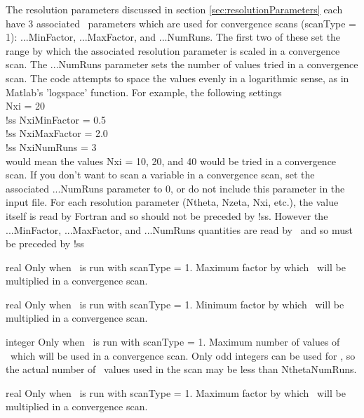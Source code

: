 The resolution parameters discussed in section \ref{sec:resolutionParameters}
each have 3 associated \sfincsScan~parameters
which are used for convergence scans ({\ttfamily scanType} = 1): {\ttfamily ...MinFactor}, {\ttfamily ...MaxFactor}, and {\ttfamily ...NumRuns}.
The first two of these set the range by which the associated resolution parameter is scaled
in a convergence scan. The {\ttfamily ...NumRuns} parameter sets the number of values tried in a
convergence scan. The code attempts to space the values evenly in a logarithmic
sense, as in Matlab's 'logspace' function. For example, the following settings\\
{\ttfamily
    Nxi = 20\\
!ss NxiMinFactor = 0.5\\
!ss NxiMaxFactor = 2.0\\
!ss NxiNumRuns = 3\\
}
would mean the values {\ttfamily Nxi} = 10, 20, and 40 would be tried in a convergence scan.
If you don't want to scan a variable in a convergence scan, set the associated
{\ttfamily ...NumRuns} parameter to 0, or do not include this parameter in the input file.
For each resolution parameter ({\ttfamily Ntheta}, {\ttfamily Nzeta}, {\ttfamily Nxi}, etc.), the value itself is read by
Fortran and so should not be preceded by {\ttfamily !ss}.  However the {\ttfamily ...MinFactor}, {\ttfamily ...MaxFactor}, and {\ttfamily ...NumRuns}
quantities are read by \sfincsScan~and so must be preceded by {\ttfamily !ss}

\myhrule

{real}
{Only when \sfincsScan~is run with {\ttfamily scanType} = 1.}
{Maximum factor by which \Ntheta~will be multiplied in a convergence scan.}

\myhrule

{real}
{Only when \sfincsScan~is run with {\ttfamily scanType} = 1.}
{Minimum factor by which \Ntheta~will be multiplied in a convergence scan.}

\myhrule

{integer}
{Only when \sfincsScan~is run with {\ttfamily scanType} = 1.}
{Maximum number of values of \Ntheta~which will be used in a convergence scan.  Only odd integers can be used
for \Ntheta, so the actual number of \Ntheta~values used in the scan may be less than {\ttfamily NthetaNumRuns}.}

\myhrule

{real}
{Only when \sfincsScan~is run with {\ttfamily scanType} = 1.}
{Maximum factor by which \Nzeta~will be multiplied in a convergence scan.}


